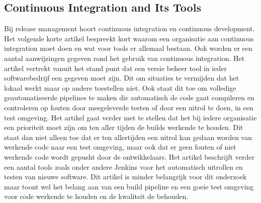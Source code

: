 \subsection{Continuous Integration and Its Tools}
Bij release management hoort continuous integration en continuous development. Het volgende korte artikel \autocite{Meyer2014} bespreekt kort waarom een organisatie aan continuous integration moet doen en wat voor tools er allemaal bestaan. Ook worden er een aantal aanwijzingen gegeven rond het gebruik van continuous integration.
\newline
\newline
Het artikel \autocite{Meyer2014} vertrekt vanuit het stand punt dat een versie beheer tool in ieder softwarebedrijf een gegeven moet zijn. Dit om situaties te vermijden dat het lokaal werkt maar op andere toestellen niet. Ook staat dit toe om volledige geautomatiseerde pipelines te maken die automatisch de code gaat compileren en controleren op fouten door meegeleverde testen of door een uitrol te doen, in een test omgeving. Het artikel gaat verder met te stellen dat het bij iedere organisatie een prioriteit moet zijn om ten aller tijden de builds werkende te houden. Dit staat dan niet alleen toe dat er ten allertijden een uitrol kan gedaan worden van werkende code naar een test omgeving, maar ook dat er geen fouten of niet werkende code wordt gepusht door de ontwikkelaars. Het artikel beschrijft verder een aantal tools zoals onder andere Jenkins voor het automatisch uitrollen en testen van nieuwe software.
\newline
\newline
Dit artikel \autocite{Meyer2014} is minder belangrijk voor dit onderzoek maar toont wel het belang aan van een build pipeline en een goeie test omgeving voor code werkende te houden en de kwaliteit de behouden.
\newline
\newline
